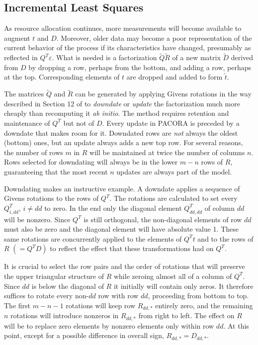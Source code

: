 \subsection*{Incremental Least Squares}

As resource allocation continues, more measurements will become available to augment $t$ and $D$.
Moreover, older data may become a poor representation of the current behavior of the process if its characteristics have changed,
presumably as reflected in $Q^T\varepsilon$.
What is needed is a factorization $\tilde{Q}\tilde{R}$ of a new matrix $\tilde{D}$
derived from $D$ by dropping a row, perhaps from the bottom,
and adding a row, perhaps at the top.
Corresponding elements of $t$ are dropped and added to form $\tilde{t}$.

The matrices $\tilde{Q}$ and $\tilde{R}$ can be generated by applying Givens rotations
in the way described in Section 12 of \cite{GoVL} to \emph{downdate} or \emph{update} the factorization
much more cheaply than recomputing it \emph{ab initio}.
The method requires retention and maintenance of $Q^T$ but not of $D$.
Every update in PACORA is preceded by a downdate that makes room for it.
Downdated rows are \emph{not} always the oldest (bottom) ones, but
an update always adds a new top row.
For several reasons, the number of rows $m$ in $R$
will be maintained at twice the number of columns $n$.
Rows selected for downdating will always be in the lower $m - n$ rows of $R$,
guaranteeing that the most recent $n$ updates are always part of the model.

Downdating makes an instructive example. A downdate applies
a sequence of Givens rotations to the rows of $Q^T$.
The rotations are calculated to set every $Q^T_{i,dd}$, $i \neq dd$ to zero.
In the end only the diagonal element $Q^T_{dd,dd}$ of column $dd$ will be nonzero.
Since $Q^T$ is still orthogonal, the non-diagonal elements of row $dd$ must also be zero
and the diagonal element will have absolute value 1.
These same rotations are concurrently applied to the elements of $Q^T t$ and to the rows of $R$ $(= Q^T D)$
to reflect the effect that these transformations had on $Q^T$.

It is crucial to select the row pairs and the order of rotations that will
preserve the upper triangular structure of $R$ while zeroing almost all of a column of $Q^T$.
Since $dd$ is below the diagonal of $R$ it initially will contain only zeros.
It therefore suffices to rotate every non-$dd$ row with row $dd$, proceeding from bottom to top.
The first $m - n - 1$ rotations will keep row $R_{dd,*}$ entirely zero,
and the remaining $n$ rotations will introduce nonzeros in $R_{dd,*}$ from right to left.
The effect on $R$ will be to replace zero elements by nonzero elements only within row $dd$.
At this point, except for a possible difference in overall sign, $R_{dd,*} = D_{dd,*}$.

